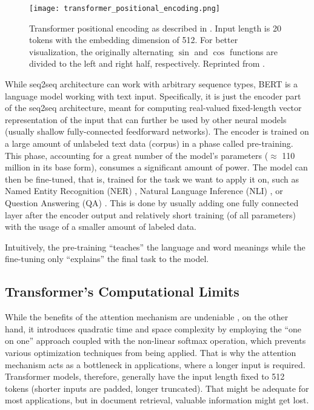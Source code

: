 \begin{figure}[!htb]
        \centering
        \texttt{[image: transformer\_positional\_encoding.png]}
        \caption[Positional Encoding of Transformer's Input]{Transformer positional encoding as described in \citep{attention-is-all-you-need}. Input length is 20 tokens with the embedding dimension of 512. For better visualization, the originally alternating $\sin$ and $\cos$ functions are divided to the left and right half, respectively. Reprinted from \citep{illustrated-transformer}.}
        \label{fig:pos_emb}
\end{figure}

While seq2seq architecture can work with arbitrary sequence types, BERT is a language model working with text input. 
Specifically, it is just the encoder part of the seq2seq architecture, meant for computing real-valued fixed-length vector representation of the input that can further be used by other neural models (usually shallow fully-connected feedforward networks).
The encoder is trained on a large amount of unlabeled text data (corpus) in a phase called pre-training.
This phase, accounting for a great number of the model's parameters ($\approx$ 110 million in its base form), consumes a significant amount of power. 
The model can then be fine-tuned, that is, trained for the task we want to apply it on, such as Named Entity Recognition (NER) \citep{ner}, Natural Language Inference (NLI) \citep{nli-bowman,nli-williams}, or Question Answering (QA) \citep{squad}. 
This is done by usually adding one fully connected layer after the encoder output and relatively short training (of all parameters) with the usage of a smaller amount of labeled data. 

Intuitively, the pre-training ``teaches'' the language and word meanings while the fine-tuning only ``explains'' the final task to the model.

\subsection{Transformer's Computational Limits}

While the benefits of the attention mechanism are undeniable \citep{attention-is-all-you-need}, on the other hand, it introduces quadratic time and space complexity by employing the ``one on one'' approach coupled with the non-linear softmax operation, which prevents various optimization techniques from being applied.
That is why the attention mechanism acts as a bottleneck in applications, where a longer input is required.
Transformer models, therefore, generally have the input length fixed to 512 tokens (shorter inputs are padded, longer truncated).
That might be adequate for most applications, but in document retrieval, valuable information might get lost.

